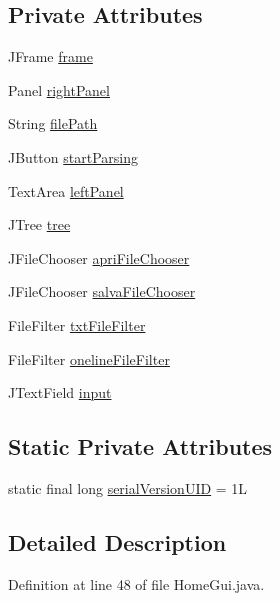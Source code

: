 \subsection*{Private Attributes}
\begin{DoxyCompactItemize}
\item 
J\-Frame \hyperlink{class_home_gui_a0b1781db25b8fdacc8970aa6166b11ad}{frame}
\item 
Panel \hyperlink{class_home_gui_adb0131b6ea64353bf6b0c5993468341c}{right\-Panel}
\item 
String \hyperlink{class_home_gui_a1f9226407f1c2c6ff8d62f84dfcebfbe}{file\-Path}
\item 
J\-Button \hyperlink{class_home_gui_aedb975e31137435a02772599392bf195}{start\-Parsing}
\item 
Text\-Area \hyperlink{class_home_gui_ac6ba89ab2c3204e87ec00b9b4962f327}{left\-Panel}
\item 
J\-Tree \hyperlink{class_home_gui_ab4af4f54e925eedcab3cb87da41410e1}{tree}
\item 
J\-File\-Chooser \hyperlink{class_home_gui_a7b615d195d8208fab52fd9db85082d46}{apri\-File\-Chooser}
\item 
J\-File\-Chooser \hyperlink{class_home_gui_ae91c33454848f18d29839444a30a5bd7}{salva\-File\-Chooser}
\item 
File\-Filter \hyperlink{class_home_gui_af20bf1a94a96e4f53e1f66337a257ce3}{txt\-File\-Filter}
\item 
File\-Filter \hyperlink{class_home_gui_a8b0192c597368a34c855abe70a8a80ec}{oneline\-File\-Filter}
\item 
J\-Text\-Field \hyperlink{class_home_gui_ab33ea273ae2f2c5bde32041076af630c}{input}
\end{DoxyCompactItemize}
\subsection*{Static Private Attributes}
\begin{DoxyCompactItemize}
\item 
static final long \hyperlink{class_home_gui_a6a93dac6b8c89a59ca14536d6f5ad414}{serial\-Version\-U\-I\-D} = 1\-L
\end{DoxyCompactItemize}


\subsection{Detailed Description}


Definition at line 48 of file Home\-Gui.\-java.



